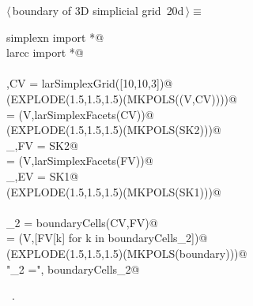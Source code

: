 \documentclass[11pt,oneside]{article}	%
\begin{document}
\begin{flushleft} \small
\begin{minipage}{\linewidth} \label{scrap45}
\protect{}$\langle\,$boundary of 3D simplicial grid\nobreak\ {\footnotesize 20d}$\,\rangle\equiv$
\vspace{-1ex}
\begin{list}{}{} \item
\mbox{}\verb@from simplexn import *@\\
\mbox{}\verb@from larcc import *@\\
\mbox{}\verb@@\\
\mbox{}\verb@V,CV = larSimplexGrid([10,10,3])@\\
\mbox{}\verb@VIEW(EXPLODE(1.5,1.5,1.5)(MKPOLS((V,CV))))@\\
\mbox{} = (V,larSimplexFacets(CV))@\\
\mbox{}\verb@VIEW(EXPLODE(1.5,1.5,1.5)(MKPOLS(SK2)))@\\
\mbox{}\verb@_,FV = SK2@\\
\mbox{} = (V,larSimplexFacets(FV))@\\
\mbox{}\verb@_,EV = SK1@\\
\mbox{}\verb@VIEW(EXPLODE(1.5,1.5,1.5)(MKPOLS(SK1)))@\\
\mbox{}\verb@@\\
\mbox{}\verb@boundaryCells_2 = boundaryCells(CV,FV)@\\
\mbox{}\verb@boundary = (V,[FV[k] for k in boundaryCells_2])@\\
\mbox{}\verb@VIEW(EXPLODE(1.5,1.5,1.5)(MKPOLS(boundary)))@\\
\mbox{}\verb@print "\nboundaryCells_2 =\n", boundaryCells_2@\\
\mbox{}\verb@@{\NWsep}
\end{list}
\vspace{-1ex}
\footnotesize\addtolength{\baselineskip}{-1ex}
\begin{list}{}{\setlength{\itemsep}{-\parsep}\setlength{\itemindent}{-\leftmargin}}
\item \NWtxtMacroRefIn\ .
\end{list}
\end{minipage}\\[4ex]
\end{flushleft}
\end{document}
